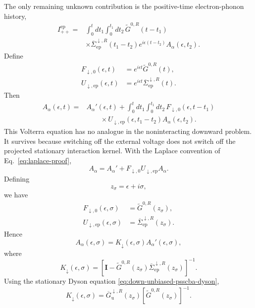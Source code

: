 \documentclass[
 reprint,
 superscriptaddress,
 amsmath,amssymb,
 aps,prb,
 longbibliography,
 floatfix
]{revtex4-2}
\newcommand{\ep}{\mathrm{ep}}
\newcommand{\barSigma}{\overline{\Sigma}}
\begin{document}
The only remaining unknown contribution is the positive-time electron-phonon history,
\begin{align*}
I_{++}^{\ep}
={}&
\int_0^t dt_1
\int_0^{t_1}dt_2\,
\widetilde G^{0,R}(t-t_1)
\\
&\times
\barSigma_{\ep}^{\downarrow,R}(t_1-t_2)
e^{i\epsilon(t-t_2)}
A_\alpha(\epsilon,t_2).
\end{align*}
Define
\begin{align*}
F_{\downarrow,0}(\epsilon,t)
&=
e^{i\epsilon t}
\widetilde G^{0,R}(t),
\\
U_{\downarrow,\ep}(\epsilon,t)
&=
e^{i\epsilon t}
\barSigma_{\ep}^{\downarrow,R}(t).
\end{align*}
Then
\begin{equation*}
\begin{aligned}
A_\alpha(\epsilon,t)
={}&
A_\alpha'(\epsilon,t)
+
\int_0^t dt_1
\int_0^{t_1}dt_2\,
F_{\downarrow,0}(\epsilon,t-t_1)
\\
&\qquad\times
U_{\downarrow,\ep}
(\epsilon,t_1-t_2)
A_\alpha(\epsilon,t_2).
\end{aligned}
\end{equation*}
This Volterra equation has no analogue in the noninteracting downward problem. It survives because switching off the external voltage does not switch off the projected stationary interaction kernel. With the Laplace convention of Eq.~\eqref{eq:laplace-proof},
\begin{equation*}
A_\alpha
=
A_\alpha'
+
F_{\downarrow,0}
U_{\downarrow,\ep}
A_\alpha.
\end{equation*}
Defining
\begin{equation*}
z_\sigma
=
\epsilon+i\sigma,
\end{equation*}
we have
\begin{align*}
F_{\downarrow,0}(\epsilon,\sigma)
&=
\widetilde G^{0,R}(z_\sigma),
\\
U_{\downarrow,\ep}(\epsilon,\sigma)
&=
\barSigma_{\ep}^{\downarrow,R}(z_\sigma).
\end{align*}
Hence
\begin{equation*}
A_\alpha(\epsilon,\sigma)
=
K_{\downarrow}(\epsilon,\sigma)
A_\alpha'(\epsilon,\sigma),
\end{equation*}
where
\begin{equation*}
K_{\downarrow}(\epsilon,\sigma)
=
\left[
\bm I
-
\widetilde G^{0,R}(z_\sigma)
\barSigma_{\ep}^{\downarrow,R}(z_\sigma)
\right]^{-1}.
\end{equation*}
Using the stationary Dyson equation
\eqref{eq:down-unbiased-psscba-dyson},
\begin{equation}
K_{\downarrow}(\epsilon,\sigma)
=
\overline G_{\mathrm u}^{\downarrow,R}
(z_\sigma)
\left[
\widetilde G^{0,R}(z_\sigma)
\right]^{-1}.
\label{eq:K-down-resolvent}
\end{equation}
\end{document}
